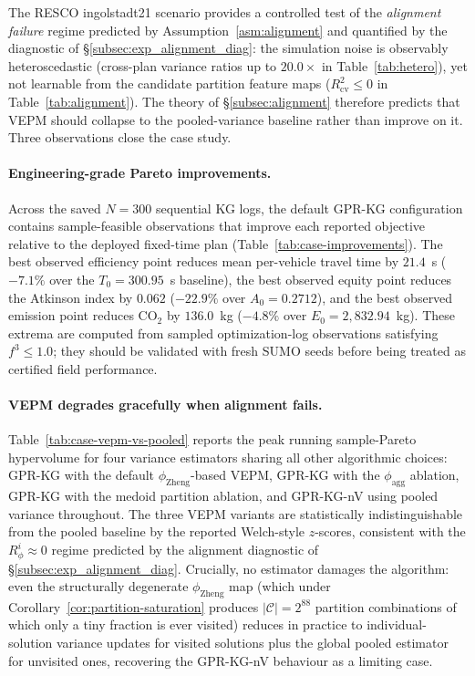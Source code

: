 \documentclass[12pt]{article}
\theoremstyle{plain}
\theoremstyle{definition}
\theoremstyle{remark}
\begin{document}
The RESCO ingolstadt21 scenario provides a controlled test of the
\emph{alignment failure} regime predicted by
Assumption~\ref{asm:alignment} and quantified by the diagnostic of
\S\ref{subsec:exp_alignment_diag}: the simulation noise is observably
heteroscedastic (cross-plan variance ratios up to $20.0\times$ in
Table~\ref{tab:hetero}), yet not learnable from the candidate partition feature maps
($R^{2}_{\mathrm{cv}}\le 0$ in Table~\ref{tab:alignment}).  The theory
of \S\ref{subsec:alignment} therefore predicts that VEPM should
collapse to the pooled-variance baseline rather than improve on it.
Three observations close the case study.

\paragraph{Engineering-grade Pareto improvements.}
Across the saved $N=300$ sequential KG logs, the default GPR-KG
configuration contains sample-feasible observations that improve each
reported objective relative to the deployed fixed-time plan
(Table~\ref{tab:case-improvements}).  The best observed efficiency point
reduces mean per-vehicle travel time by $21.4$~s ($-7.1\%$ over the
$T_{0}=300.95$~s baseline), the best observed equity point reduces the
Atkinson index by $0.062$ ($-22.9\%$ over $A_{0}=0.2712$), and the best
observed emission point reduces CO$_2$ by $136.0$~kg ($-4.8\%$ over
$E_{0}=2{,}832.94$~kg).  These extrema are computed from sampled
optimization-log observations satisfying $f^3\le 1.0$; they should be
validated with fresh SUMO seeds before being treated as certified field
performance.

\paragraph{VEPM degrades gracefully when alignment fails.}
Table~\ref{tab:case-vepm-vs-pooled} reports the peak running
sample-Pareto hypervolume for four variance estimators sharing all
other algorithmic choices: GPR-KG with the default
$\phi_{\mathrm{Zheng}}$-based VEPM, GPR-KG with the
$\phi_{\mathrm{agg}}$ ablation, GPR-KG with the medoid partition
ablation, and GPR-KG-nV using pooled variance throughout.  The three
VEPM variants are statistically indistinguishable from the pooled
baseline by the reported Welch-style $z$-scores, consistent with the
$R_\phi^{i}\approx 0$ regime predicted by the alignment diagnostic of
\S\ref{subsec:exp_alignment_diag}.  Crucially, no estimator damages the
algorithm: even the structurally degenerate $\phi_{\mathrm{Zheng}}$
map (which under Corollary~\ref{cor:partition-saturation} produces
$|\mathcal{C}|=2^{88}$ partition combinations of which only a tiny fraction is
ever visited) reduces in practice to individual-solution variance
updates for visited solutions plus the global pooled estimator for
unvisited ones, recovering the GPR-KG-nV behaviour as a limiting case.
\end{document}

